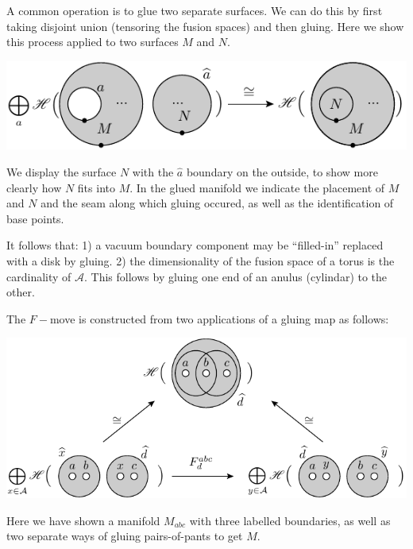 \documentclass[aps, prl, letterpaper, twocolumn, superscriptaddress, notitlepage, 10pt]{revtex4-1}
\newcommand{\A}{\mathcal{A}}
\begin{document}
A common operation is to glue two separate surfaces.
We can do this by first taking disjoint union (tensoring
the fusion spaces)
and then gluing.
Here we show this process applied to two surfaces $M$ and $N$. 
\begin{center}
\includegraphics[]{pic-glue.pdf}
\end{center}
We display the surface $N$ with the $\widehat{a}$
boundary on the outside, 
to show more clearly how $N$ fits into $M$.
In the glued manifold we
indicate the placement of $M$ and $N$ and the seam
along which gluing occured,
as well as the identification of base points.


It follows that:
1) a vacuum boundary component may be ``filled-in''
replaced with a disk by gluing.
2) the dimensionality of the fusion space of a torus is the
cardinality of $\A.$ This follows by gluing one end
of an anulus (cylindar) to the other.

The $F-$move
is constructed from two applications of a
gluing map as follows:

\begin{center}
\includegraphics[]{pic-glue-fmove.pdf}
\end{center}

Here we have shown a manifold $M_{abc}$ with 
three labelled boundaries, as well as two separate
ways of gluing pairs-of-pants to get $M.$
\end{document}
